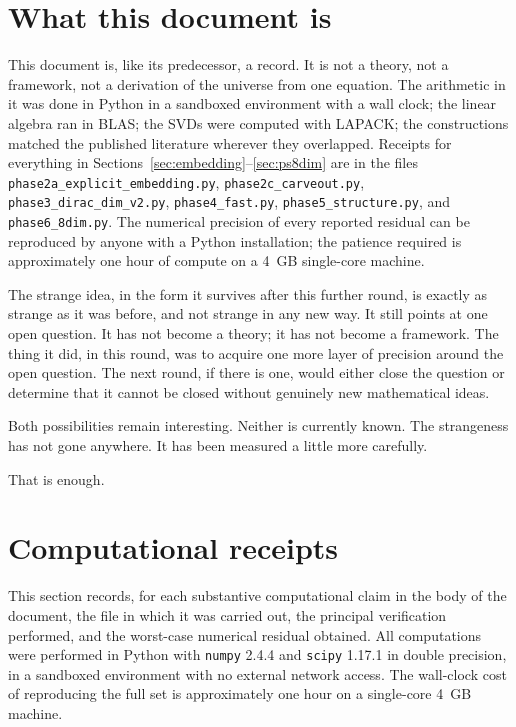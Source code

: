 \documentclass[11pt,a4paper]{article}
\begin{document}
\section{What this document is}\label{sec:what-this-is}

This document is, like its predecessor, a record. It is not a theory, not a
framework, not a derivation of the universe from one equation. The arithmetic
in it was done in Python in a sandboxed environment with a wall clock; the
linear algebra ran in BLAS; the SVDs were computed with LAPACK; the
constructions matched the published literature wherever they overlapped.
Receipts for everything in Sections~\ref{sec:embedding}--\ref{sec:ps8dim} are
in the files \texttt{phase2a\_explicit\_embedding.py},
\texttt{phase2c\_carveout.py}, \texttt{phase3\_dirac\_dim\_v2.py},
\texttt{phase4\_fast.py}, \texttt{phase5\_structure.py}, and
\texttt{phase6\_8dim.py}. The numerical precision of every reported residual
can be reproduced by anyone with a Python installation; the patience required
is approximately one hour of compute on a 4~GB single-core machine.

The strange idea, in the form it survives after this further round, is
exactly as strange as it was before, and not strange in any new way. It still
points at one open question. It has not become a theory; it has not become a
framework. The thing it did, in this round, was to acquire one more layer of
precision around the open question. The next round, if there is one, would
either close the question or determine that it cannot be closed without
genuinely new mathematical ideas.

Both possibilities remain interesting. Neither is currently known. The
strangeness has not gone anywhere. It has been measured a little more
carefully.

That is enough.

\appendix

\section{Computational receipts}\label{app:receipts}

This section records, for each substantive computational claim in the body of
the document, the file in which it was carried out, the principal verification
performed, and the worst-case numerical residual obtained. All computations
were performed in Python with \texttt{numpy} 2.4.4 and \texttt{scipy} 1.17.1 in
double precision, in a sandboxed environment with no external network access.
The wall-clock cost of reproducing the full set is approximately one hour on a
single-core 4~GB machine.
\end{document}

